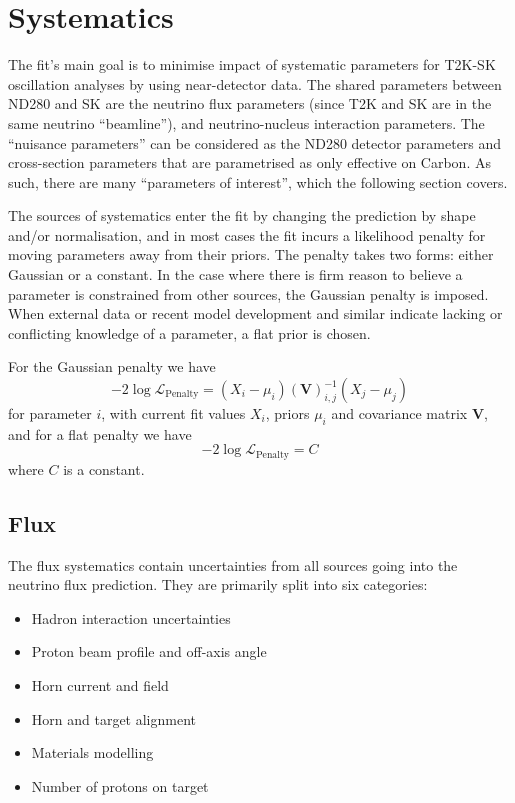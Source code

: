 \section{Systematics}
\label{sec:syst}
The fit's main goal is to minimise impact of systematic parameters for T2K-SK oscillation analyses by using near-detector data. The shared parameters between ND280 and SK are the neutrino flux parameters (since T2K and SK are in the same neutrino ``beamline''), and neutrino-nucleus interaction parameters. The ``nuisance parameters'' can be considered as the ND280 detector parameters and cross-section parameters that are parametrised as only effective on Carbon. As such, there are many ``parameters of interest'', which the following section covers.

The sources of systematics enter the fit by changing the prediction by shape and/or normalisation, and in most cases the fit incurs a likelihood penalty for moving parameters away from their priors. The penalty takes two forms: either Gaussian or a constant. In the case where there is firm reason to believe a parameter is constrained from other sources, the Gaussian penalty is imposed. When external data or recent model development and similar indicate lacking or conflicting knowledge of a parameter, a flat prior is chosen.

For the Gaussian penalty we have
\begin{equation}
	-2\log\mathcal{L}_\text{Penalty} = (X_i-\mu_i) \left(\mathbf{V}\right)^{-1}_{i,j} (X_j-\mu_j)
\end{equation}
for parameter $i$, with current fit values $X_i$, priors $\mu_i$ and covariance matrix $\mathbf{V}$, and for a flat penalty we have
\begin{equation}
	-2\log\mathcal{L}_\text{Penalty} = C
\end{equation}
where $C$ is a constant.

\subsection{Flux}
\label{subsec:syst_flux}
The flux systematics contain uncertainties from all sources going into the neutrino flux prediction. They are primarily split into six categories:
\begin{itemize}
	\item Hadron interaction uncertainties
	\item Proton beam profile and off-axis angle
	\item Horn current and field
	\item Horn and target alignment
	\item Materials modelling
	\item Number of protons on target
\end{itemize}

